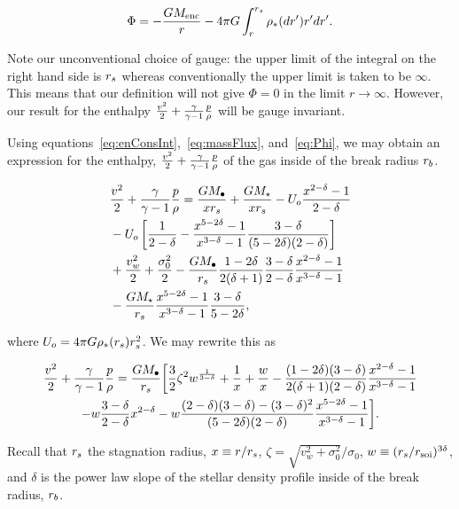 \begin{align}
\Phi= -\frac{G M_{\rm enc}}{r} - 4 \pi G \int_{r}^{r_s} \rho_*(dr') r'
dr'.
\label{eq:Phi}
\end{align}

Note our unconventional choice of gauge: the upper limit of the
integral on the right hand side is $r_s$ whereas conventionally the
upper limit is taken to be $\infty$. This means that our definition
will not give $\Phi=0$ in the limit $r\rightarrow\infty$. However,
our result for the enthalpy $\frac{v^2}{2} + \frac{\gamma}{\gamma-1} \frac{p}{\rho}$ will be
gauge invariant. 

Using equations~\eqref{eq:enConsInt},~\eqref{eq:massFlux},
and~\eqref{eq:Phi}, we may obtain an expression for the enthalpy,
$\frac{v^2}{2}+\frac{\gamma}{\gamma-1} \frac{p}{\rho}$ of the gas inside of the break radius
$r_b$. 

\begin{align}
  &\frac{v^2}{2}+\frac{\gamma}{\gamma-1} \frac{p}{\rho} = \frac{G M_{\bullet}}{x r_s} +
  \frac{G
    M_\star}{x r_s} - U_o \frac{x^{2-\delta}-1}{2-\delta}\nonumber\\
  &-U_o\left[\frac{1}{2-\delta}-\frac{x^{5-2\delta}-1}{x^{3-\delta}-1}\frac{3-\delta}{(5-2\delta)(2-\delta)}\right]\nonumber\\
  &+\frac{v_w^2}{2}+\frac{\sigma_0^2}{2}- \frac{G M_{\bullet}}{r_s}
  \frac{1-2\delta}{2(\delta+1)} \frac{3-\delta}{2-\delta}\frac{x^{2-\delta}-1}{x^{3-\delta}-1}
  \nonumber\\
  &-\frac{G M_\star}{r_s}
  \frac{x^{5-2\delta}-1}{x^{3-\delta}-1}\frac{3-\delta}{5-2\delta},
\end{align}

where $U_o=4 \pi G \rho_*(r_s) r_s^2$.  We may rewrite this as 

\begin{multline}
  \frac{v^2}{2}+\frac{\gamma}{\gamma-1} \frac{p}{\rho}
=\frac{G M_{\bullet}}{r_s} 
\biggl[
  \frac{3}{2} \zeta^2 w^{\frac{1}{3 -\delta}}+\frac{1}{x}+\frac{w}{x}
  -\frac{(1-2\delta)(3-\delta)}{2(\delta+1)(2-\delta)}  \frac{x^{2  -\delta}-1}{x^{3-\delta}-1}\\
  -w \frac{3 -\delta}{2 -\delta} x^{2 -\delta}
  -w \frac{(2-\delta)(3-\delta)-(3-\delta)^{2}}{(5-2\delta)(2-\delta)} \frac{x^{5-2\delta}-1}{x^{3-\delta}-1}
\biggr].
\label{eq:enthAnal}
\end{multline}

Recall that $r_s$ the stagnation radius, $x\equiv r/r_s$, $\zeta=\sqrt{v_w^2+\sigma_0^2}/\sigma_0$, $w\equiv (r_s/r_{\rm soi})^{3\delta}$, and
$\delta$ is the power law slope of the stellar density profile inside
of the break radius, $r_b$.

